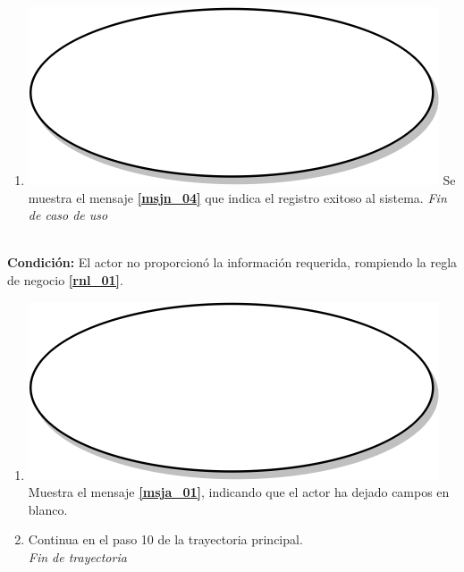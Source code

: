 \begin{enumerate}
  \item {\includegraphics[scale=.05]{Capitulo3/img/proceso.png} Se muestra el mensaje \textbf{\ref{msjn_04}} que indica el registro exitoso al sistema.}
  \textit{Fin de caso de uso} \\  
\end{enumerate}

\textbf{} \\
\textbf{Condición:} El actor no proporcionó la información requerida, rompiendo la regla de negocio \textbf{\ref{rnl_01}}.\\
 \begin{enumerate}[label=A\arabic*]
    \item {\includegraphics[scale=.05]{Capitulo3/img/proceso.png} Muestra el mensaje \textbf{\ref{msja_01}}, indicando que el actor ha dejado campos en blanco.}
    \item {Continua en el paso 10  de la trayectoria principal.} \\
    \textit{Fin de trayectoria} \\
\end{enumerate}

